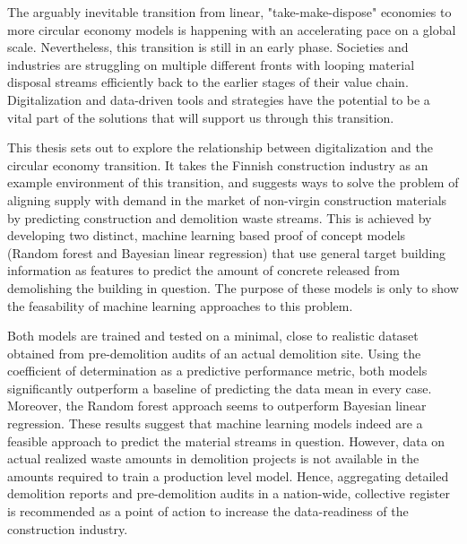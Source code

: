 \documentclass[english, 12pt, a4paper, sci, utf8, a-2b, online]{aaltothesis}
\date{31.12.2022}
\begin{document}
\makecoverpage

\makecopyrightpage


\begin{abstractpage}[english]
  The arguably inevitable transition from linear, "take-make-dispose" economies to more circular economy models is
  happening with an accelerating pace on a global scale. Nevertheless, this transition is still in an
  early phase. Societies and industries are struggling on multiple different fronts with looping
  material disposal streams efficiently back to the earlier stages of their value chain. Digitalization
  and data-driven tools and strategies have the potential to be a vital part of the solutions that will
  support us through this transition.

  This thesis sets out to explore the relationship between digitalization and the circular economy transition.
  It takes the Finnish construction industry as an example environment of this transition, and suggests ways to solve
  the problem of aligning supply with demand in the market of non-virgin construction materials by predicting construction and
  demolition waste streams. This is achieved by developing two distinct, machine learning based proof of concept models
  (Random forest and Bayesian linear regression) that use general target building information as features to predict the amount
  of concrete released from demolishing the building in question. The purpose of these models is only to show the feasability
  of machine learning approaches to this problem.

  Both models are trained and tested on a minimal, close to realistic dataset obtained from pre-demolition audits of an actual
  demolition site. Using the coefficient of determination as a predictive performance metric, both models significantly
  outperform a baseline of predicting the data mean in every case. Moreover, the Random forest approach seems to outperform
  Bayesian linear regression. These results suggest that machine learning models indeed are a feasible approach to predict
  the material streams in question. However, data on actual realized waste amounts in demolition projects is not available
  in the amounts required to train a production level model. Hence, aggregating detailed demolition reports and pre-demolition
  audits in a nation-wide, collective register is recommended as a point of action to increase the data-readiness of the
  construction industry.
\end{abstractpage}
\end{document}
